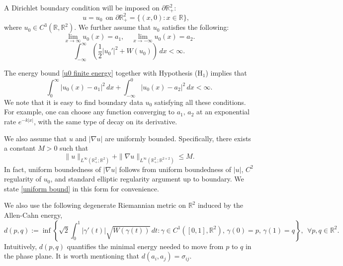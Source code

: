 \documentclass[leqno,11pt]{amsart}
\let\pa=\partial
\let\g=\gamma
\let\f=\frac
\let\pa=\partial
\let\ri=\rightarrow
\let\na=\nabla
\theoremstyle{remark}
\newcommand{\BR}{\mathbb{R}}
\begin{document}
A Dirichlet boundary condition will be imposed on $\pa \BR^2_+$:
\begin{equation}
    \label{bdy cond}
    \qquad u=u_0\ \ \text{on }\pa \BR^2_+=\{(x,0):x\in\BR\},
\end{equation}
where $u_0\in C^3(\mathbb{R},\BR^2)$. We further assume that $u_0$ satisfies the following: 
\begin{equation*}
    \lim\limits_{x\ri\infty} u_0(x)=a_1,\quad  \lim\limits_{x\to-\infty}u_0(x)=a_2.
\end{equation*}
\begin{equation}\label{u0 finite energy}
    \int_{-\infty}^\infty \left(\f12|u_0'|^2+W(u_0)\right)\,dx<\infty.
\end{equation}


The energy bound \eqref{u0 finite energy} together with Hypothesis ($\mathrm{H}_1$) implies that
\begin{equation}\label{u_0 conv to a1 a2}
    \int_0^\infty |u_0(x)-a_1|^2\,dx+\int_{-\infty}^0 |u_0(x)-a_2|^2\,dx<\infty.
\end{equation}
We note that it is easy to find boundary data $u_0$ satisfying all these conditions. For example, one can choose any function converging to $a_1,\,a_2$ at an exponential rate $e^{-k|x|}$, with the same type of decay on its derivative.

We also assume that $u$ and $|\na u|$ are uniformly bounded. Specifically, there exists a constant $M>0$ such that  
\begin{equation}\label{uniform bound}
    \|u\|_{L^\infty(\BR^2_+;\BR^2)}+ \|\na u\|_{L^\infty(\BR^2_+;\BR^{2\times 2})}\leq M.
\end{equation}
In fact, uniform boundedness of $|\na u|$ follows from uniform boundedness of $|u|$, $C^2$ regularity of $u_0$, and standard elliptic regularity argument up to boundary. We state \eqref{uniform bound} in this form for convenience. 

We also use the following degenerate Riemannian metric on $\mathbb{R}^2$ induced by the Allen-Cahn energy,  
\begin{equation}\label{def:metric d}
    d(p,q):=\inf\left\{\sqrt{2} \int_0^1 |\g'(t)|\sqrt{W(\g(t))}\,dt: \g\in C^1([0,1],\mathbb{R}^2),\, \g(0)=p,\,\g(1)=q\right\}, \ \ \forall p,q\in\BR^2. 
\end{equation}
Intuitively, $d(p,q)$ quantifies the minimal energy needed to move from $p$ to $q$ in the phase plane. It is worth mentioning that $d(a_i,a_j)=\sigma_{ij}$.
\end{document}
